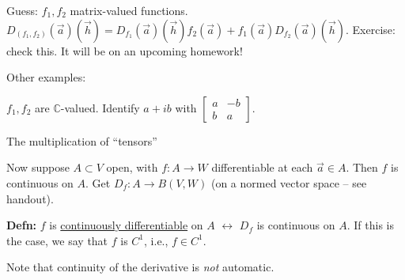\documentclass[10pt,letterpaper]{article}
\newcommand{\n}{\hfill\break}
\newcommand{\defn}[1]{\par\noindent\settowidth{\hangindent}{\textbf{Defn: }}\textbf{Defn: }#1\n}
\newcommand{\complex}{\mathbb{C}}
\newcommand{\C}{\complex}
\begin{document}
\par\noindent Guess: $f_{1},f_{2}$ matrix-valued functions.\n
$D_{(f_{1},f_{2})}(\vec{a})(\vec{h})=D_{f_{1}}(\vec{a})(\vec{h})f_{2}(\vec{a})+f_{1}(\vec{a})D_{f_{2}}(\vec{a})(\vec{h})$.\n
Exercise: check this. It will be on an upcoming homework!\n

\par\noindent Other examples:\n

\par\noindent $f_{1},f_{2}$ are $\C$-valued. Identify $a+ib$ with $\left[\begin{array}{cc}a & -b\\ b & a\end{array}\right]$.\n

\par\noindent The multiplication of ``tensors''\n

\par\noindent Now suppose $A\subset{}V$ open, with $f:A\to{}W$ differentiable at each $\vec{a}\in{}A$. Then $f$ is continuous on $A$.\n
Get $D_{f}:A\to{}B(V,W)$ (on a normed vector space -- see handout).\n

\defn{$f$ is \underline{continuously differentiable} on $A$ $\leftrightarrow$ $D_{f}$ is continuous on $A$. If this is the case, we say that $f$ is $C^{1}$, i.e., $f\in{}C^{1}$.}

\par\noindent Note that continuity of the derivative is \textit{not} automatic.\n
\end{document}
